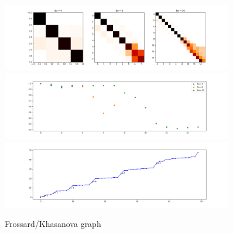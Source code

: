 \begin{figure}[h!]
	\centering
	\includegraphics[width=0.9\textwidth]{../codes/02.HeatKernelGraphLaplacian/equiangular/equi_Khasanova_Frossard_full.png}
	\includegraphics[width=0.9\textwidth]{../codes/02.HeatKernelGraphLaplacian/equiangular/equi_Khasanova_Frossard_full_diagonal.png}
	\includegraphics[width=0.9\textwidth]{../codes/02.HeatKernelGraphLaplacian/equiangular/equi_full_Khasanova_Frossard_eigenvalues_16.png}
	\caption{\label{fig:Frossard/Khasanova graph}Frossard/Khasanova graph}
\end{figure}

